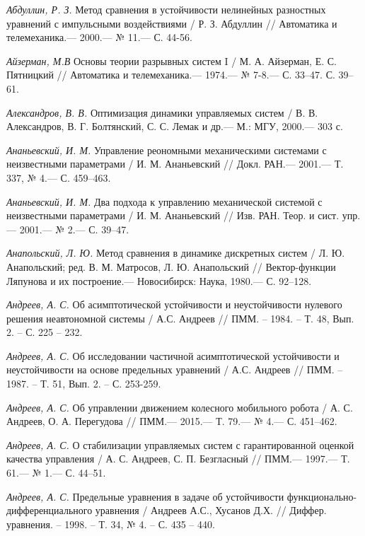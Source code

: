\begin{thebibliography}{10} \label{bibl}
	{\it Абдуллин, Р. З.} Метод сравнения в устойчивости нелинейных разностных уравнений с импульсными воздействиями
	/ Р. З. Абдуллин // Автоматика и телемеханика.— 2000.— № 11.— С. 44-56. 	
	
	{\it Айзерман, М.В} Основы теории разрывных систем I / М. А. Айзерман, Е. С. Пятницкий
	// Автоматика и телемеханика.— 1974.— № 7-8.— С. 33–47. С. 39–61.
	
	{\it Александров, В. В.} Оптимизация динамики управляемых систем / В. В. Александров, В. Г. Болтянский,
	С. С. Лемак и др.— М.: МГУ, 2000.— 303 с.
	
	{\it Ананьевский, И. М.} Управление реономными механическими системами с неизвестными параметрами /
	И. М. Ананьевский // Докл. РАН.— 2001.— Т. 337, № 4.— С. 459–463.
	
	{\it Ананьевский, И. М.} Два подхода к управлению механической системой с неизвестными параметрами /
	И. М. Ананьевский // Изв. РАН. Теор. и сист. упр.— 2001.— № 2.— С. 39–47.
	
	{\it Анапольский, Л. Ю.} Метод сравнения в динамике дискретных систем /
	Л. Ю. Анапольский; ред. В. М. Матросов, Л. Ю. Анапольский // Вектор-функции Ляпунова и их построение.— Новосибирск: Наука, 1980.— С. 92–128.
	
	{\it Андреев, А. С.} Об асимптотической устойчивости и неустойчивости нулевого решения неавтономной системы / А.С. Андреев // ПММ. – 1984. – Т. 48, Вып. 2. – С. 225 – 232.
	
	{\it Андреев, А. С.} Об исследовании частичной асимптотической устойчивости и неустойчивости на основе предельных уравнений / А.С. Андреев // ПММ. – 1987. – Т. 51, Вып. 2. – С. 253-259.
	
	{\it Андреев, А. С.} Об управлении движением колесного мобильного робота /
	А. С. Андреев, О. А. Перегудова // ПММ.— 2015.— Т. 79.— № 4.— С. 451–462.
	
	{\it Андреев, А. С.} О стабилизации управляемых систем с гарантированной оценкой качества управления /
	А. С. Андреев, С. П. Безгласный // ПММ.— 1997.— Т. 61.— № 1.— С. 44–51.
	
	{\it Андреев, А. С.} Предельные уравнения в задаче об устойчивости функционально-дифференциального уравнения / Андреев А.С., Хусанов Д.Х. // Диффер. уравнения. – 1998. – Т. 34, № 4. – С. 435 – 440.
	

\end{thebibliography}

